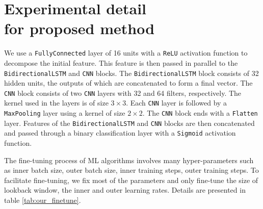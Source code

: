 \documentclass[aps,prb,groupedaddress,twocolumn,showpacs,dvipdfmx,superscriptaddress,pdftex]{revtex4-2}
\begin{document}
\section{Experimental detail\\for proposed method}
\label{app:our_experiment}


We use a \verb|FullyConnected| layer of 16 units with a \verb|ReLU| activation function to decompose the initial feature. This feature is then passed in parallel to the \verb|BidirectionalLSTM| and \verb|CNN| blocks. The \verb|BidirectionalLSTM| block consists of 32 hidden units, the outputs of which are concatenated to form a final vector. The \verb|CNN| block consists of two \verb|CNN| layers with 32 and 64 filters, respectively. The kernel used in the layers is of size $3\times 3$. Each \verb|CNN| layer is followed by a \verb|MaxPooling| layer using a kernel of size $2\times 2$. The \verb|CNN| block ends with a \verb|Flatten| layer. Features of the \verb|BidirectionalLSTM| and \verb|CNN| blocks are then concatenated and passed through a binary classification layer with a \verb|Sigmoid| activation function.

\vspace{2mm}

The fine-tuning process of ML algorithms involves many hyper-parameters such as inner batch size, outer batch size, inner training steps, outer training steps. To facilitate fine-tuning, we fix most of the parameters and only fine-tune the size of lookback window, the inner and outer learning rates. Details are presented in table \ref{tab:our_finetune}.
\end{document}

